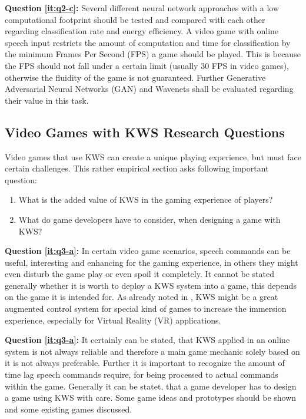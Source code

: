\textbf{Question \ref{it:q2-c}:}
Several different neural network approaches with a low computational footprint should be tested and compared with each other regarding classification rate and energy efficiency. 
A video game with online speech input restricts the amount of computation and time for classification by the minimum Frames Per Second (FPS) a game should be played.
This is because the FPS should not fall under a certain limit (usually 30 FPS in video games), otherwise the fluidity of the game is not guaranteed.
Further Generative Adversarial Neural Networks (GAN) and Wavenets shall be evaluated regarding their value in this task.



\subsection{Video Games with KWS Research Questions}\label{sec:intro_rq_games}
Video games that use KWS can create a unique playing experience, but must face certain challenges.
This rather empirical section asks following important question:

\begin{enumerate}[label={Q.3.\alph*)}, leftmargin=1.75cm]
  \item What is the added value of KWS in the gaming experience of players?\label{it:q3-a}
  \item What do game developers have to consider, when designing a game with KWS?\label{it:q3-b}
\end{enumerate}
\noindent
\textbf{Question \ref{it:q3-a}:}
In certain video game scenarios, speech commands can be useful, interesting and enhancing for the gaming experience, in others they might even disturb the game play or even spoil it completely.
It cannot be stated generally whether it is worth to deploy a KWS system into a game, this depends on the game it is intended for.
As already noted in , KWS might be a great augmented control system for special kind of games to increase the immersion experience, especially for Virtual Reality (VR) applications.

\textbf{Question \ref{it:q3-a}:} It certainly can be stated, that KWS applied in an online system is not always reliable and therefore a main game mechanic solely based on it is not always preferable.
Further it is important to recognize the amount of time lag speech commands require, for being processed to actual commands within the game.
Generally it can be statet, that a game developer has to design a game using KWS with care.
Some game ideas and prototypes should be shown and some existing games discussed.